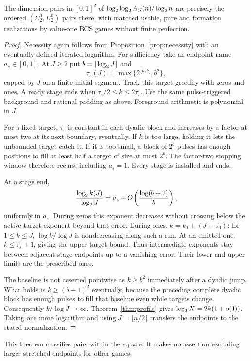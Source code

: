 \begin{theorem}\label{thm:stretched}
The dimension pairs in $[0,1]^2$ of $\log_2\log_2 A_G(n)/\log_2 n$ are precisely the ordered $(\Sigma^0_2,\Pi^0_2)$ pairs there, with matched usable, pure and formation realizations by value-one BCS games without finite perfection.
\end{theorem}
\begin{proof}
Necessity again follows from Proposition~\ref{prop:necessity} with an eventually defined iterated logarithm. For sufficiency take an endpoint name $a_s\in[0,1]$. At $J\ge2$ put $b=\lfloor\log_2 J\rfloor$ and
\[
 \tau_s(J)=\max\{2^{\lfloor a_sb\rfloor},b^2\},
\]
capped by $J$ on a finite initial segment. Track this target greedily with zeros and ones. A ready stage ends when $\tau_s/2\le k\le2\tau_s$. Use the same pulse-triggered background and rational padding as above. Foreground arithmetic is polynomial in $J$.

For a fixed target, $\tau_s$ is constant in each dyadic block and increases by a factor at most two at its next boundary, eventually. If $k$ is too large, holding it lets the unbounded target catch it. If it is too small, a block of $2^b$ pulses has enough positions to fill at least half a target of size at most $2^b$. The factor-two stopping window therefore recurs, including $a_s=1$. Every stage is installed and ends.

At a stage end,
\[
 \frac{\log_2 k(J)}{\log_2 J}
 =a_s+O\left(\frac{\log(b+2)}b\right),
\]
uniformly in $a_s$. During zeros this exponent decreases without crossing below the active target exponent beyond that error. During ones, $k=k_0+(J-J_0)$; for $1\le k\le J$, $\log k/\log J$ is nondecreasing along such a run. At an emitted one, $k\le\tau_s+1$, giving the upper target bound. Thus intermediate exponents stay between adjacent stage endpoints up to a vanishing error. Their lower and upper limits are the prescribed ones.

The baseline is not asserted pointwise as $k\ge b^2$ immediately after a dyadic jump. What holds is $k\ge(b-1)^2$ eventually, because the preceding complete dyadic block has enough pulses to fill that baseline even while targets change. Consequently $k/\log J\to\infty$. Theorem~\ref{thm:profile} gives $\log_2 X=2k(1+o(1))$. Taking one more logarithm and using $J=\lfloor n/2\rfloor$ transfers the endpoints to the stated normalization.
\end{proof}

This theorem classifies pairs within the square. It makes no assertion excluding larger stretched endpoints for other games.

